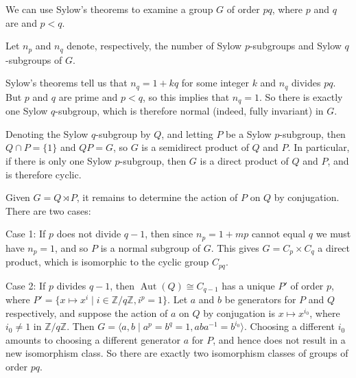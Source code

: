 \documentclass[12pt]{article}
\DeclareMathOperator{\Aut}{Aut}
\def\Integer{\mathbb{Z}}
\def\inn#1{{\langle #1\rangle}}
\def\set#1{{\{#1\}}}
\begin{document}

We can use Sylow's theorems to examine a group $G$ of order $pq$, where $p$ and $q$ are  and $p<q$.

Let $n_p$ and $n_q$ denote, respectively, the number of Sylow $p$-subgroups and Sylow $q$-subgroups of $G$.

Sylow's theorems tell us that 
$n_q=1+kq$ for some integer $k$
and $n_q$ divides $pq$.
But $p$ and $q$ are prime and $p<q$, so this implies that $n_q=1$.
So there is exactly one Sylow $q$-subgroup, which is therefore normal (indeed, fully invariant) in $G$.

Denoting the Sylow $q$-subgroup by $Q$, and letting $P$ be a Sylow $p$-subgroup, then $Q\cap P=\{1\}$ and $QP=G$, so $G$ is a semidirect product of $Q$ and $P$. In particular, if there is only one Sylow $p$-subgroup, then $G$ is a direct product of $Q$ and $P$, and is therefore cyclic.

Given $G=Q \rtimes P$, it remains to determine the action of $P$ on $Q$ by conjugation. There are two cases:

Case 1: If $p$ does not divide $q-1$, then since $n_p=1+mp$ cannot equal $q$ we must have $n_p=1$, and so $P$ is a normal subgroup of $G$. This gives $G=C_p \times C_q$ a direct product, which is isomorphic to the cyclic group $C_{pq}$.

Case 2: If $p$ divides $q-1$,
then $\Aut(Q) \cong C_{q-1}$ has a unique  $P'$ of order $p$,
where $P'=\set{x \mapsto x^i \mid i \in \Integer/q \Integer, i^p=1}$.
Let $a$ and $b$ be generators for $P$ and $Q$ respectively,
and suppose the action of $a$ on $Q$ by conjugation is $x \mapsto x^{i_0}$,
where $i_0 \neq 1$ in $\Integer/q \Integer$.
Then $G=\inn{a,b \mid a^p=b^q=1, aba^{-1}=b^{i_0}}$.
Choosing a different $i_0$
amounts to choosing a different generator $a$ for $P$,
and hence does not result in a new isomorphism class.
So there are exactly two isomorphism classes of groups of order $pq$.
\end{document}
